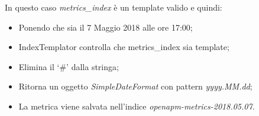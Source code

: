 		In questo caso \textit{metrics\_index} è un template valido e quindi:
		\begin{itemize}
		        \item Ponendo che sia il 7 Maggio 2018 alle ore 17:00;
			\item IndexTemplator controlla che metrics\_index sia template;
			\item Elimina il `\#' dalla stringa;
			\item Ritorna un oggetto \textit{SimpleDateFormat} con pattern \textit{yyyy.MM.dd};
			\item La metrica viene salvata nell'indice \textit{openapm-metrics-2018.05.07}.
		\end{itemize}

